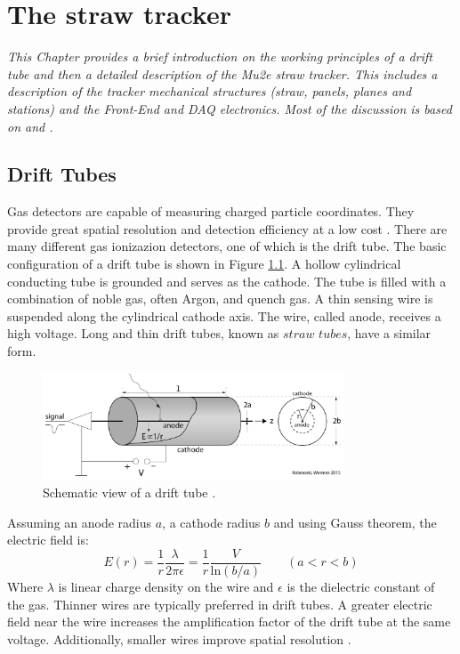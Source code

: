 \chapter{The straw tracker}\label{chaptertrk}

\textit{This Chapter provides a brief introduction on the working principles 
of a drift tube and then a  detailed description of the Mu2e straw tracker. 
This includes a description of the tracker mechanical structures 
(straw, panels, planes and stations) and the Front-End and DAQ electronics. 
Most of the discussion is based on \cite{kola} and \cite{bobbb}.}

\section{Drift Tubes}
Gas detectors are capable of measuring charged particle coordinates. 
They provide great spatial resolution and detection efficiency at a low cost \cite{kola}. 
There are many different gas ionizazion detectors, one of which is the drift tube.
The basic configuration of a drift tube is shown in Figure \ref{fig:drifttube}.
A hollow cylindrical conducting tube is grounded and serves as the cathode.
The tube is filled with a combination of noble gas, often Argon, and quench gas. 
A thin sensing wire is suspended along the cylindrical cathode axis. 
The wire, called anode, receives a high voltage. Long and thin drift tubes, known as $straw$ $tubes$, have a similar form.
\begin{figure}[!h]
    \centering
    \includegraphics[width =0.8\textwidth]{figures/png/Screenshot_20240324_232621.png}
    \caption[Schematic view of a drift tube.]{Schematic view of a drift tube \cite{kola}.}
    \label{fig:drifttube}
    \end{figure}
Assuming an anode radius $a$, a cathode radius $b$ and using Gauss theorem, the electric field is:
\begin{equation}\label{avalanche}
    E(r)=\frac{1}{r}\frac{\lambda}{2\pi \epsilon}=\frac{1}{r}\frac{V}{ \text{ln}(b/a)} \qquad (a<r<b)
\end{equation}
Where $\lambda$ is linear charge density on the wire and $\epsilon$ is the dielectric constant of the gas.
Thinner wires are typically preferred in drift tubes. A greater electric field near the wire increases the amplification factor 
of the drift tube at the same voltage. Additionally, smaller wires improve spatial resolution \cite{kola}. 
